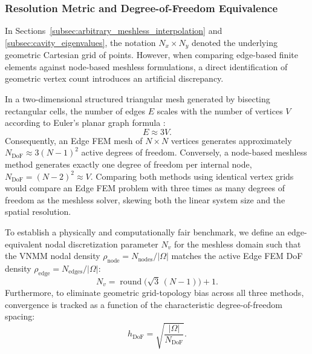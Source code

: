 \documentclass[preprint,12pt]{elsarticle}
\begin{document}
\subsubsection{Resolution Metric and Degree-of-Freedom Equivalence}
In Sections~\ref{subsec:arbitrary_meshless_interpolation} and \ref{subsec:cavity_eigenvalues}, the notation $N_x \times N_y$ denoted the underlying geometric Cartesian grid of points. However, when comparing edge-based finite elements against node-based meshless formulations, a direct identification of geometric vertex count introduces an artificial discrepancy. 

In a two-dimensional structured triangular mesh generated by bisecting rectangular cells, the number of edges $E$ scales with the number of vertices $V$ according to Euler's planar graph formula \cite{deberg2008computational}:
\begin{equation}
    E \approx 3V.
    \label{eq:euler_edge_vertex}
\end{equation}
Consequently, an Edge FEM mesh of $N \times N$ vertices generates approximately $N_{\mathrm{DoF}} \approx 3(N-1)^2$ active degrees of freedom. Conversely, a node-based meshless method generates exactly one degree of freedom per internal node, $N_{\mathrm{DoF}} = (N - 2)^2 \approx V$. Comparing both methods using identical vertex grids would compare an Edge FEM problem with three times as many degrees of freedom as the meshless solver, skewing both the linear system size and the spatial resolution.

To establish a physically and computationally fair benchmark, we define an edge-equivalent nodal discretization parameter $N_v$ for the meshless domain such that the VNMM nodal density $\rho_{\mathrm{node}} = N_{\mathrm{nodes}} / |\Omega|$ matches the active Edge FEM DoF density $\rho_{\mathrm{edge}} = N_{\mathrm{edges}} / |\Omega|$:
\begin{equation}
    N_v = \operatorname{round}\bigl(\sqrt{3}\,(N - 1)\bigr) + 1.
    \label{eq:edge_equivalent_nv}
\end{equation}
Furthermore, to eliminate geometric grid-topology bias across all three methods, convergence is tracked as a function of the characteristic degree-of-freedom spacing:
\begin{equation}
    h_{\mathrm{DoF}} = \sqrt{\frac{|\Omega|}{N_{\mathrm{DoF}}}}.
    \label{eq:h_dof_definition}
\end{equation}
\end{document}
